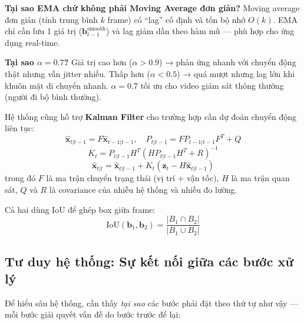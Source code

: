 \textbf{Tại sao EMA chứ không phải Moving Average đơn giản?} Moving average đơn giản (tính trung bình $k$ frame) có ``lag'' cố định và tốn bộ nhớ $O(k)$. EMA chỉ cần lưu 1 giá trị ($\mathbf{b}_{t-1}^{\text{smooth}}$) và lag giảm dần theo hàm mũ --- phù hợp cho ứng dụng real-time.

\textbf{Tại sao $\alpha = 0.7$?} Giá trị cao hơn ($\alpha > 0.9$) → phản ứng nhanh với chuyển động thật nhưng vẫn jitter nhiều. Thấp hơn ($\alpha < 0.5$) → quá mượt nhưng lag lớn khi khuôn mặt di chuyển nhanh. $\alpha = 0.7$ tối ưu cho video giám sát thông thường (người đi bộ bình thường).

\medskip
Hệ thống cũng hỗ trợ \textbf{Kalman Filter} cho trường hợp cần dự đoán chuyển động liên tục:
\begin{equation}
    \hat{\mathbf{x}}_{t|t-1} = F \hat{\mathbf{x}}_{t-1|t-1}, \quad P_{t|t-1} = F P_{t-1|t-1} F^T + Q
\end{equation}
\begin{equation}
    K_t = P_{t|t-1} H^T (H P_{t|t-1} H^T + R)^{-1}
\end{equation}
\begin{equation}
    \hat{\mathbf{x}}_{t|t} = \hat{\mathbf{x}}_{t|t-1} + K_t (\mathbf{z}_t - H \hat{\mathbf{x}}_{t|t-1})
\end{equation}
trong đó $F$ là ma trận chuyển trạng thái (vị trí + vận tốc), $H$ là ma trận quan sát, $Q$ và $R$ là covariance của nhiễu hệ thống và nhiễu đo lường.

\medskip
Cả hai dùng IoU để ghép box giữa frame:
\begin{equation}
    \text{IoU}(\mathbf{b}_1, \mathbf{b}_2) = \frac{|B_1 \cap B_2|}{|B_1 \cup B_2|}
    \label{eq:iou}
\end{equation}

\subsection{Tư duy hệ thống: Sự kết nối giữa các bước xử lý}
\label{subsec:tuduyhetong}

Để hiểu sâu hệ thống, cần thấy \textit{tại sao} các bước phải đặt theo thứ tự như vậy --- mỗi bước giải quyết vấn đề do bước trước để lại:


